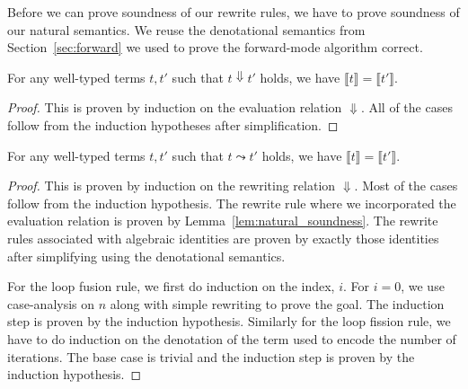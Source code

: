 Before we can prove soundness of our rewrite rules, we have to prove soundness of our natural semantics.
We reuse the denotational semantics from Section~\ref{sec:forward} we used to prove the forward-mode algorithm correct.

\begin{lemma}\label{lem:natural_soundness}
  For any well-typed terms $t, t'$ such that $t \Downarrow t'$ holds, we have $\llbracket t \rrbracket = \llbracket t' \rrbracket$.
\end{lemma}
\begin{proof}
  This is proven by induction on the evaluation relation $\Downarrow$.
  All of the cases follow from the induction hypotheses after simplification.
\end{proof}

\begin{theorem}
  For any well-typed terms $t, t'$ such that $t \leadsto t'$ holds, we have $\llbracket t \rrbracket = \llbracket t' \rrbracket$.
\end{theorem}
\begin{proof}
  This is proven by induction on the rewriting relation $\Downarrow$.
  Most of the cases follow from the induction hypothesis.
  The rewrite rule where we incorporated the evaluation relation is proven by Lemma~\ref{lem:natural_soundness}.
  The rewrite rules associated with algebraic identities are proven by exactly those identities after simplifying using the denotational semantics.

  For the loop fusion rule, we first do induction on the index, $i$.
  For $i = 0$, we use case-analysis on $n$ along with simple rewriting to prove the goal. The induction step is proven by the induction hypothesis.
  Similarly for the loop fission rule, we have to do induction on the denotation of the term used to encode the number of iterations.
  The base case is trivial and the induction step is proven by the induction hypothesis.
\end{proof}